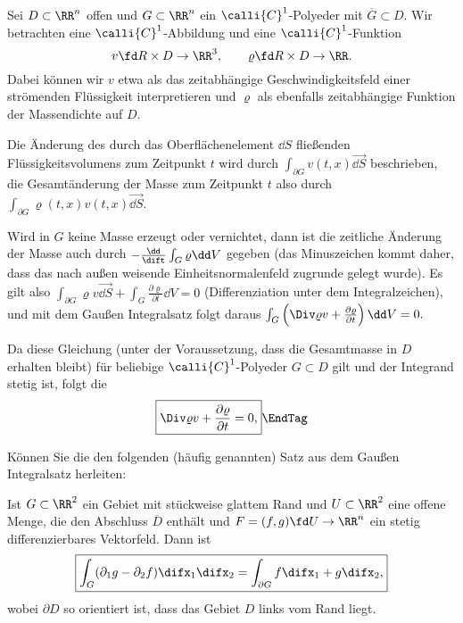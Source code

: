 \begin{antwort}
  Sei $D\subset\RR^n$ offen und 
  $G\subset \RR^n$ ein $\calli{C}^1$-Polyeder 
  mit $\overline{G}\subset D$. 
  Wir betrachten eine $\calli{C}^1$-Abbildung und eine 
  $\calli{C}^1$-Funktion 
  \[
  v \fd R\times D \to \RR^3, \qquad
  \varrho \fd R\times D \to \RR.
  \] 
  Dabei können wir $v$ etwa als das zeitabhängige Geschwindigkeitsfeld 
  einer strömenden Flüssigkeit interpretieren und $\varrho$ als 
  ebenfalls zeitabhängige Funktion der Massendichte auf $D$. 

  Die Änderung des durch das 
  Oberflächenelement $\dd S$ fließenden Flüssigkeitsvolumens zum 
  Zeitpunkt $t$ wird durch $\int_{\partial G} v(t,x) \overrightarrow{\dd S}$ 
  beschrieben, die Gesamtänderung der Masse zum Zeitpunkt $t$ also durch 
  $\int_{\partial G} \varrho(t,x) v(t,x) \overrightarrow{\dd S}$. 

  Wird in $G$ keine Masse erzeugt oder vernichtet, dann ist die zeitliche 
  Änderung der Masse auch durch 
  $-\frac{\dd}{\dift} \int_G \varrho \dd V$ gegeben (das Minuszeichen 
  kommt daher, dass das nach außen weisende Einheitsnormalenfeld zugrunde 
  gelegt wurde). Es gilt also 
  $\int_{\partial G} \varrho v \overrightarrow{\dd S} + 
  \int_G \frac{\partial \varrho}{\partial t} \dd V =0$ 
  (Differenziation unter dem Integralzeichen), 
  und mit dem Gauß\sch en Integralsatz folgt daraus 
  $
  \int_{G} \left( 
    \Div \varrho v + 
    \frac{\partial \varrho}{\partial t} \right) \dd V  =0.
  $

  Da diese Gleichung (unter der Voraussetzung, dass 
  die Gesamtmasse in $D$ erhalten bleibt)
  für beliebige $\calli{C}^1$-Polyeder $G\subset D$ gilt und der 
  Integrand stetig ist, folgt die 
  \[
  \boxed{
    \Div \varrho v + 
    \frac{\partial \varrho}{\partial t} =0,
  }\EndTag
  \]
  
\end{antwort} 

\begin{frage}
  Können Sie die den folgenden (häufig  genannten) 
  Satz aus dem Gauß\sch en Integralsatz herleiten:

  Ist $G\subset\RR^2$ ein Gebiet mit stückweise glattem Rand und 
  $U\subset\RR^2$ eine offene Menge, die den Abschluss $\overline{D}$ 
  enthält und $F=(f,g)\fd U\to\RR^n$ ein stetig differenzierbares Vektorfeld. 
  Dann ist 
  \[
  \boxed{
    \int_G ( \partial_1 g - \partial_2 f ) \difx_1 \difx_2 = 
    \int_{\partial G} f\difx_1 +g\difx_2,}
  \]
  wobei $\partial D$ so orientiert ist, dass das Gebiet $D$ links vom Rand liegt.
\end{frage}

